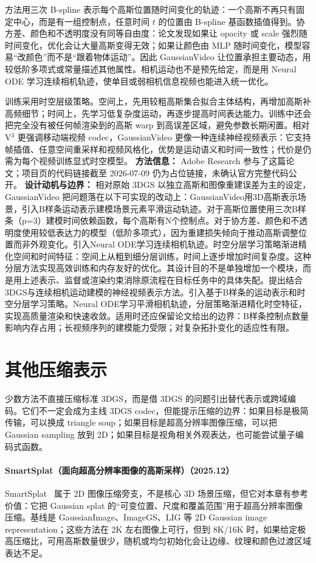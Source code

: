 方法用三次 B-spline 表示每个高斯位置随时间变化的轨迹：一个高斯不再只有固定中心，而是有一组控制点，任意时间 $t$ 的位置由 B-spline 基函数插值得到。协方差、颜色和不透明度没有同等自由度：论文发现如果让 opacity 或 scale 强烈随时间变化，优化会让大量高斯变得无效；如果让颜色由 MLP 随时间变化，模型容易“改颜色”而不是“跟着物体运动”。因此 GaussianVideo 让位置承担主要动态，用较低阶多项式或常量描述其他属性。相机运动也不是预先给定，而是用 Neural ODE 学习连续相机轨迹，使单目或弱相机信息视频也能进入统一优化。

训练采用时空层级策略。空间上，先用较粗高斯集合拟合主体结构，再增加高斯补高频细节；时间上，先学习低复杂度运动，再逐步提高时间表达能力。训练中还会把完全没有被任何帧渲染到的高斯 warp 到高误差区域，避免参数长期闲置。相对 V$^3$ 更强调移动端视频 codec，GaussianVideo 更像一种连续神经视频表示：它支持帧插值、任意空间重采样和视频风格化，优势是运动语义和时间一致性；代价是仍需为每个视频训练显式时空模型。
\textbf{方法信息：} Adobe Research 参与了这篇论文；项目页的代码链接截至 2026-07-09 仍为占位链接，未确认官方完整代码公开。
\textbf{设计动机与边界：} 相对原始 3DGS 以独立高斯和图像重建误差为主的设定，GaussianVideo 把问题落在以下可实现的改动上：GaussianVideo用3D高斯表示场景，引入B样条运动表示建模场景元素平滑运动轨迹。对于高斯位置使用三次B样条（p=3）建模时间依赖函数，每个高斯有N个控制点。对于协方差、颜色和不透明度使用较低表达力的模型（低阶多项式），因为重建损失倾向于推动高斯调整位置而非外观变化。引入Neural ODE学习连续相机轨迹。时空分层学习策略渐进精化空间和时间特征：空间上从粗到细分层训练，时间上逐步增加时间复杂度。这种分层方法实现高效训练和内存友好的优化。其设计目的不是单独增加一个模块，而是用上述表示、监督或渲染约束消除原流程在目标任务中的具体失配。提出结合3DGS与连续相机运动建模的神经视频表示方法。引入基于B样条的运动表示和时空分层学习策略。Neural ODE学习平滑相机轨迹，分层策略渐进精化时空特征，实现高质量渲染和快速收敛。适用时还应保留论文给出的边界：B样条控制点数量影响内存占用；长视频序列的建模能力受限；对复杂拓扑变化的适应性有限。

\section{其他压缩表示}

少数方法不直接压缩标准 3DGS，而是借 3DGS 的问题引出替代表示或跨域编码。它们不一定会成为主线 3DGS codec，但能提示压缩的边界：如果目标是极简传输，可以换成 triangle soup；如果目标是超高分辨率图像压缩，可以把 Gaussian sampling 放到 2D；如果目标是视角相关外观表达，也可能尝试量子编码式函数。
\paragraph{SmartSplat（面向超高分辨率图像的高斯采样）（2025.12）}
SmartSplat~\cite{2512_20377} 属于 2D 图像压缩旁支，不是核心 3D 场景压缩，但它对本章有参考价值：它把 Gaussian splat 的“可变位置、尺度和覆盖范围”用于超高分辨率图像压缩。基线是 GaussianImage、ImageGS、LIG 等 2D Gaussian image representation；这些方法在 2K 左右图像上可行，但到 8K/16K 时，如果给定极高压缩比，可用高斯数量很少，随机或均匀初始化会让边缘、纹理和颜色过渡区域表达不足。

